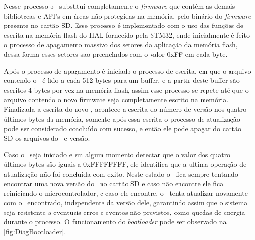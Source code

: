 Nesse processo o \bootloader\ substitui completamente o \textit{firmware} que contém as demais bibliotecas e API's em áreas não protegidas na memória, pelo binário do \textit{firmware} presente no cartão SD. Esse processo é implementado com o uso das funções de escrita na memória flash do HAL fornecido pela STM32, onde inicialmente é feito o processo de apagamento massivo dos setores da aplicação da memória flash, dessa forma esses setores são preenchidos com o valor 0xFF em cada byte.

Após o processo de apagamento é iniciado o processo de escrita, em que o arquivo contendo o \firmware\ é lido a cada 512 bytes para um buffer, e a partir deste buffer são escritos 4 bytes por vez na memória flash, assim esse processo se repete até que o arquivo contendo o novo firmware seja completamente escrito na memória.
Finalizada a escrita do novo \firmware, acontece a escrita do número de versão nos quatro últimos bytes da memória, somente após essa escrita o processo de atualização pode ser considerado concluído com sucesso, e então ele pode apagar do cartão SD os arquivos do \firmware\ e versão.

Caso o \bootloader\ seja iniciado e em algum momento detectar que o valor dos quatro últimos bytes são iguais a 0xFFFFFFFF, ele identifica que a ultima operação de atualização não foi concluída com exito. Neste estado o \bootloader\ fica sempre tentando encontrar uma nova versão do \firmware\ no cartão SD e caso não encontre ele fica reiniciando o microcontrolador, e caso ele encontre, o \bootloader\ tenta atualizar novamente com o \firmware\ encontrado, independente da versão dele, garantindo assim que o sistema seja resistente a eventuais erros e eventos não previstos, como quedas de energia durante o processo. O funcionamento do \textit{bootloader} pode ser observado na \autoref{fig:DiagBootloader}.

